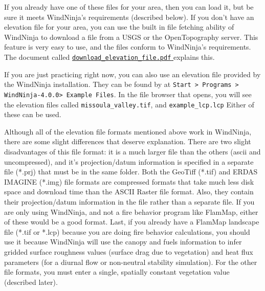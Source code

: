 \documentclass[12pt]{article}
\newcommand\vn{4.0.0}
\begin{document}
If you already have one of these files for your area, then you can load it, but be sure it meets WindNinja's requirements (described below).  
If you don't have an elevation file for your area, you can use the built in file fetching ability of WindNinja to download a file from a USGS or the OpenTopography server.  
This feature is very easy to use, and the files conform to WindNinja's requirements.  
The document called \href{https://ninjastorm.firelab.org/windninja/tutorials/download_elevation_file.pdf}{\texttt{download\_elevation\_file.pdf} } explains this.

If you are just practicing right now, you can also use an elevation file provided by the WindNinja installation.
They can be found by at \texttt{Start > Programs > WindNinja-\vn > Example Files}.
In the file browser that opens, you will see the elevation files called \texttt{missoula\_valley.tif}, and \texttt{example\_lcp.lcp} Either of these can be used.

Although all of the elevation file formats mentioned above work in WindNinja, there are some slight differences that deserve explanation.  
There are two slight disadvantages of this file format: it is a much larger file than the others (ascii and uncompressed), and it's projection/datum information is specified in a separate file (*.prj) that must be in the same folder.  Both the GeoTiff (*.tif) and ERDAS IMAGINE (*.img) file formats are compressed formats that take much less disk space and download time than the ASCII Raster file format.  
Also, they contain their projection/datum information in the file rather than a separate file.  
If you are only using WindNinja, and not a fire behavior program like FlamMap, either of these would be a good format.  
Last, if you already have a FlamMap landscape file (*.tif or *.lcp) because you are doing fire behavior calculations, you should use it because WindNinja will use the canopy and fuels information to infer gridded surface roughness values (surface drag due to vegetation) and heat flux parameters (for a diurnal flow or non-neutral stability simulation).  
For the other file formats, you must enter a single, spatially constant vegetation value (described later).
\end{document}

